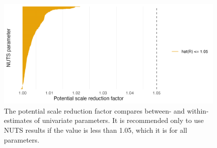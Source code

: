 \documentclass[a4paper, nobind]{templates/ociamthesis}
\newcommand*{\bibtitle}{Works Cited}
\begin{document}
\begin{figure}

{\centering \includegraphics[width=0.95\linewidth]{resources/naomi-aghq/20230811-095752-5b8181d8/depends/rhat} 

}

\caption{The potential scale reduction factor compares between- and within- estimates of univariate parameters. It is recommended only to use NUTS results if the value is less than 1.05, which it is for all parameters.}\label{fig:rhat}
\end{figure}




\setlength{\baselineskip}{0pt} %

{\renewcommand*\MakeUppercase[1]{#1}%
\printbibliography[heading=bibintoc,title={\bibtitle}]}
\end{document}
